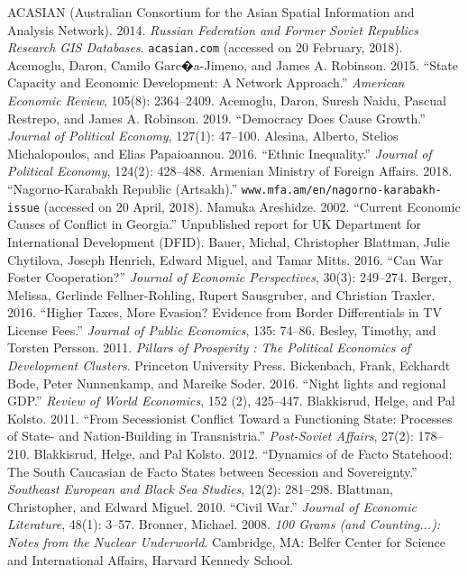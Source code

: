 \documentclass[12pt,a4paper]{article}%
\begin{document}
\begin{thebibliography}{99}
\bibitem{} ACASIAN (Australian Consortium for the Asian Spatial Information and Analysis Network). 2014. \textit{Russian Federation and Former Soviet Republics Research GIS Databases}. \verb!acasian.com! (accessed on 20 February, 2018).
\bibitem{} Acemoglu, Daron, Camilo Garc�a-Jimeno, and James A. Robinson. 2015. ``State Capacity and Economic Development: A Network Approach.'' \textit{American Economic Review}, 105(8): 2364--2409.
\bibitem{} Acemoglu, Daron, Suresh Naidu, Pascual Restrepo, and James A. Robinson. 2019. ``Democracy Does Cause Growth.'' \textit{Journal of Political Economy}, 127(1): 47--100.
\bibitem{} Alesina, Alberto, Stelios Michalopoulos, and Elias Papaioannou. 2016. ``Ethnic Inequality.'' \textit{Journal of Political Economy}, 124(2): 428--488.
\bibitem{} Armenian Ministry of Foreign Affairs. 2018. ``Nagorno-Karabakh Republic (Artsakh).'' \verb!www.mfa.am/en/nagorno-karabakh-issue! (accessed on 20 April, 2018).
\bibitem{} Mamuka Areshidze. 2002. ``Current Economic Causes of Conflict in Georgia.'' Unpublished report for UK Department for International Development (DFID).
\bibitem{} Bauer, Michal, Christopher Blattman, Julie Chytilova, Joseph Henrich, Edward Miguel, and Tamar Mitts. 2016. ``Can War Foster Cooperation?'' \textit{Journal of Economic Perspectives}, 30(3): 249--274.
\bibitem{} Berger, Melissa, Gerlinde Fellner-Rohling, Rupert Sausgruber, and Christian Traxler. 2016. ``Higher Taxes, More Evasion? Evidence from Border Differentials in TV License Fees.'' \textit{Journal of Public Economics}, 135: 74--86.
\bibitem{} Besley, Timothy, and Torsten Persson. 2011. \textit{Pillars of Prosperity : The Political Economics of Development Clusters}. Princeton University Press.
\bibitem{} Bickenbach, Frank, Eckhardt Bode, Peter Nunnenkamp, and Mareike Soder. 2016. ``Night lights and regional GDP.'' \textit{Review of World Economics}, 152 (2), 425--447.
\bibitem{} Blakkisrud, Helge, and Pal Kolsto. 2011. ``From Secessionist Conflict Toward a Functioning State: Processes of State- and Nation-Building in Transnistria.'' \textit{Post-Soviet Affairs}, 27(2): 178--210.
\bibitem{} Blakkisrud, Helge, and Pal Kolsto. 2012. ``Dynamics of de Facto Statehood: The South Caucasian de Facto States between Secession and Sovereignty.'' \textit{Southeast European and Black Sea Studies}, 12(2): 281--298.
\bibitem{} Blattman, Christopher, and Edward Miguel. 2010. ``Civil War.'' \textit{Journal of Economic Literature}, 48(1): 3--57.      
\bibitem{} Bronner, Michael. 2008. \textit{100 Grams (and Counting...): Notes from the Nuclear Underworld}. Cambridge, MA: Belfer Center for Science and International Affairs, Harvard Kennedy School.       

\end{thebibliography}
\end{document}
